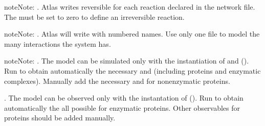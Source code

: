 \documentclass[letterpaper,10pt,english]{sphinxmanual}
\begin{document}
\begin{sphinxVerbatim}[commandchars=\\\{\},numbers=left,firstnumber=1,stepnumber=1]
	        
	 
	 
\end{sphinxVerbatim}

\begin{sphinxadmonition}{note}{Note:}
. Atlas writes reversible  for each
reaction declared in the network file. The 
must be set to zero to define an irreversible reaction.
\end{sphinxadmonition}

\begin{sphinxadmonition}{note}{Note:}
. Atlas will write  with numbered
names. Use only one file to model the many interactions the system has.
\end{sphinxadmonition}

\begin{sphinxadmonition}{note}{Note:}
. The model can be simulated only with the instantiation of
 and  ().
Run  to obtain
automatically the necessary  and  (including
proteins and enzymatic complexes). Manually add the necessary 
and  for non\sphinxhyphen{}enzymatic proteins.

. The model can be observed only with the instantation of
 ().
Run  to obtain
automatically the all possible  for enzymatic proteins. Other
observables for proteins should be added manually.
\end{sphinxadmonition}
\end{document}

